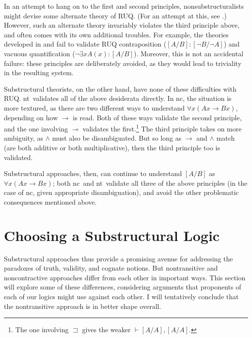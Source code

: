 \documentclass{ergoclass}
\newcommand{\sqq}[2]{\ensuremath{#1  \mathrel{:}  #2}}
\newcommand{\rall}[3]{\ensuremath{#1[#2/#3]}}
\newcommand{\amforall}{\ensuremath{\forall}}
\newcommand{\amcond}{\ensuremath{\rightarrow}}
\newcommand{\amand}{\ensuremath{\wedge}}
\newcommand{\mcond}{\ensuremath{\multimap}}
\newcommand{\acond}{\ensuremath{\sqsupset}}
\newcommand{\nclog}{{\sc nc}}
\newcommand{\ntlog}{{\sc nt}}
\renewcommand{\cite}{\citet}						%
\begin{document}
In an attempt to hang on to the first and second principles, nonsubstructuralists might devise some alternate theory of RUQ. (For an attempt at this, see \citealt*{rrq}.) However, such an alternate theory invariably violates the third principle above, and often comes with its own additional troubles. For example, the theories developed in \cite{rrq} and \cite{beall:atrrq} fail to validate RUQ contraposition ($\sqq{\rall{}{A}{B}}{\rall{}{\neg B}{\neg A}}$) and vacuous quantification ($\sqq{\neg \exists x A(x)}{\rall{}{A}{B}}$). Moreover, this is not an accidental failure: these principles are deliberately avoided, as they would lead to triviality in the resulting system.





Substructural theorists, on the other hand, have none of these difficulties with RUQ. \ntlog\ validates all of the above desiderata directly. In \nclog, the situation is more textured, as there are two different ways to understand $\amforall x (Ax \amcond Bx)$, depending on how $\amcond$ is read. Both of these ways validate the second principle, and the one involving $\mcond$ validates the first.\footnote{The one involving $\acond$ gives the weaker $\vdash \rall{}{A}{A}, \rall{}{A}{A}$.} The third principle takes on more ambiguity, as $\amand$ must also be disambiguated. But so long as $\amcond$ and $\amand$ match (are both additive or both multiplicative), then the third principle too is validated.



Substructural approaches, then, can continue to understand $\rall{}{A}{B}$ as $\amforall x (Ax \amcond Bx)$; both \nclog\ and \ntlog\ validate all three of the above principles (in the case of \nclog, given appropriate disambiguation), and avoid the other problematic consequences mentioned above. 




\section{Choosing a Substructural Logic} \label{choosing} \label{howsub}

Substructural approaches thus provide a promising avenue for addressing the paradoxes of truth, validity, and cognate notions. But nontransitive and noncontractive approaches differ from each other in important ways. This section will explore some of these differences, considering arguments that proponents of each of our logics might use against each other. I will tentatively conclude that the nontransitive approach is in better shape overall.
\end{document}
